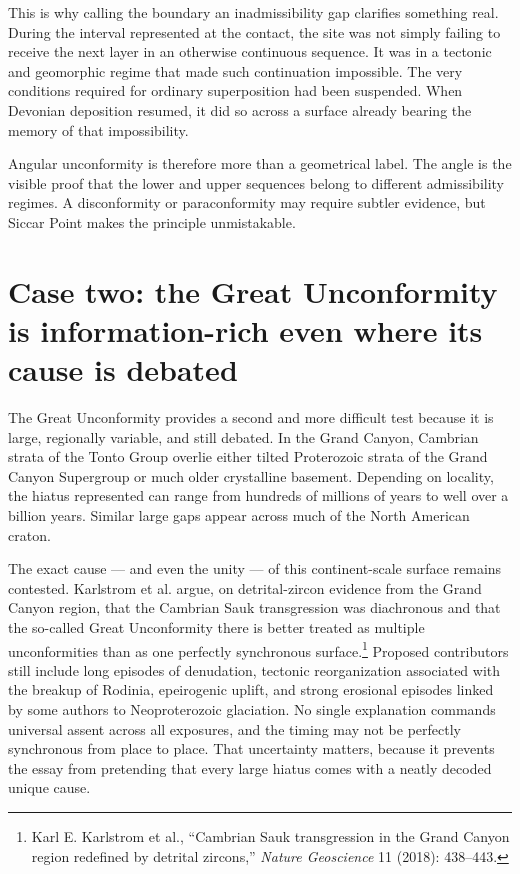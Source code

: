 \documentclass[11pt]{article}
\begin{document}
This is why calling the boundary an inadmissibility gap clarifies something real. During the interval represented at the contact, the site was not simply failing to receive the next layer in an otherwise continuous sequence. It was in a tectonic and geomorphic regime that made such continuation impossible. The very conditions required for ordinary superposition had been suspended. When Devonian deposition resumed, it did so across a surface already bearing the memory of that impossibility.

Angular unconformity is therefore more than a geometrical label. The angle is the visible proof that the lower and upper sequences belong to different admissibility regimes. A disconformity or paraconformity may require subtler evidence, but Siccar Point makes the principle unmistakable.

\section{Case two: the Great Unconformity is information-rich even where its cause is debated}
The Great Unconformity provides a second and more difficult test because it is large, regionally variable, and still debated. In the Grand Canyon, Cambrian strata of the Tonto Group overlie either tilted Proterozoic strata of the Grand Canyon Supergroup or much older crystalline basement. Depending on locality, the hiatus represented can range from hundreds of millions of years to well over a billion years. Similar large gaps appear across much of the North American craton.

The exact cause --- and even the unity --- of this continent-scale surface remains contested. Karlstrom et al. argue, on detrital-zircon evidence from the Grand Canyon region, that the Cambrian Sauk transgression was diachronous and that the so-called Great Unconformity there is better treated as multiple unconformities than as one perfectly synchronous surface.\footnote{Karl E. Karlstrom et al., ``Cambrian Sauk transgression in the Grand Canyon region redefined by detrital zircons,'' \emph{Nature Geoscience} 11 (2018): 438--443.} Proposed contributors still include long episodes of denudation, tectonic reorganization associated with the breakup of Rodinia, epeirogenic uplift, and strong erosional episodes linked by some authors to Neoproterozoic glaciation. No single explanation commands universal assent across all exposures, and the timing may not be perfectly synchronous from place to place. That uncertainty matters, because it prevents the essay from pretending that every large hiatus comes with a neatly decoded unique cause.
\end{document}
